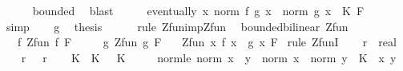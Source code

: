 \begin{isabellebody}
\ \ \ \ \isamarkupfalse%
\ bounded\ \isamarkupfalse%
\ blast\isanewline
\ \ \isamarkupfalse%
\ \isamarkupfalse%
\ {\isachardoublequoteopen}eventually\ {\isacharparenleft}{\kern0pt}{\isasymlambda}x{\isachardot}{\kern0pt}\ norm\ {\isacharparenleft}{\kern0pt}f\ {\isacharparenleft}{\kern0pt}g\ x{\isacharparenright}{\kern0pt}{\isacharparenright}{\kern0pt}\ {\isasymle}\ norm\ {\isacharparenleft}{\kern0pt}g\ x{\isacharparenright}{\kern0pt}\ {\isacharasterisk}{\kern0pt}\ K{\isacharparenright}{\kern0pt}\ F{\isachardoublequoteclose}\isanewline
\ \ \ \ \isamarkupfalse%
\ simp\isanewline
\ \ \isamarkupfalse%
\ g\ \isamarkupfalse%
\ {\isacharquery}{\kern0pt}thesis\isanewline
\ \ \ \ \isamarkupfalse%
\ {\isacharparenleft}{\kern0pt}rule\ Zfun{\isacharunderscore}{\kern0pt}imp{\isacharunderscore}{\kern0pt}Zfun{\isacharparenright}{\kern0pt}\isanewline
{}\isamarkupfalse%
%
\endisatagproof
{\isafoldproof}%
%
\isadelimproof
\isanewline
%
\endisadelimproof
\isanewline
{}\isamarkupfalse%
\ {\isacharparenleft}{\kern0pt}\ bounded{\isacharunderscore}{\kern0pt}bilinear{\isacharparenright}{\kern0pt}\ Zfun{\isacharcolon}{\kern0pt}\isanewline
\ \ \ f{\isacharcolon}{\kern0pt}\ {\isachardoublequoteopen}Zfun\ f\ F{\isachardoublequoteclose}\isanewline
\ \ \ \ \ g{\isacharcolon}{\kern0pt}\ {\isachardoublequoteopen}Zfun\ g\ F{\isachardoublequoteclose}\isanewline
\ \ \ {\isachardoublequoteopen}Zfun\ {\isacharparenleft}{\kern0pt}{\isasymlambda}x{\isachardot}{\kern0pt}\ f\ x\ {\isacharasterisk}{\kern0pt}{\isacharasterisk}{\kern0pt}\ g\ x{\isacharparenright}{\kern0pt}\ F{\isachardoublequoteclose}\isanewline
%
\isadelimproof
%
\endisadelimproof
%
\isatagproof
{}\isamarkupfalse%
\ {\isacharparenleft}{\kern0pt}rule\ ZfunI{\isacharparenright}{\kern0pt}\isanewline
\ \ \isamarkupfalse%
\ r\ {\isacharcolon}{\kern0pt}{\isacharcolon}{\kern0pt}\ real\isanewline
\ \ \isamarkupfalse%
\ r{\isacharcolon}{\kern0pt}\ {\isachardoublequoteopen}{}\ {\isacharless}{\kern0pt}\ r{\isachardoublequoteclose}\isanewline
\ \ \isamarkupfalse%
\ K\ \ K{\isacharcolon}{\kern0pt}\ {\isachardoublequoteopen}{}\ {\isacharless}{\kern0pt}\ K{\isachardoublequoteclose}\isanewline
\ \ \ \ \ norm{\isacharunderscore}{\kern0pt}le{\isacharcolon}{\kern0pt}\ {\isachardoublequoteopen}norm\ {\isacharparenleft}{\kern0pt}x\ {\isacharasterisk}{\kern0pt}{\isacharasterisk}{\kern0pt}\ y{\isacharparenright}{\kern0pt}\ {\isasymle}\ norm\ x\ {\isacharasterisk}{\kern0pt}\ norm\ y\ {\isacharasterisk}{\kern0pt}\ K{\isachardoublequoteclose}\ \ x\ y\isanewline

\end{isabellebody}
